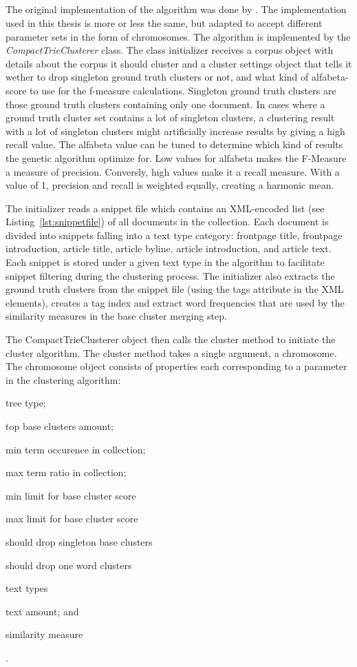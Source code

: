 \subsection{\CTC}
The original implementation of the \CTC algorithm was done by \supervisor. The implementation used in this thesis is more or less the same, but adapted to accept different parameter sets in the form of chromosomes. The algorithm is implemented by the \textit{CompactTrieClusterer} class. The class initializer receives a corpus object with details about the corpus it should cluster and a cluster settings object that tells it wether to drop singleton ground truth clusters or not, and what kind of alfabeta-score to use for the f-measure calculations. Singleton ground truth clusters are those ground truth clusters containing only one document. In cases where a ground truth cluster set contains a lot of singleton clusters, a clustering result with a lot of singleton clusters might artificially increase results by giving a high recall value. The alfabeta value can be tuned to determine which kind of results the genetic algorithm optimize for. Low values for alfabeta makes the F-Measure a measure of precision. Conversly, high values make it a recall measure. With a value of 1, precision and recall is weighted equally, creating a harmonic mean.

The initializer reads a snippet file which contains an XML-encoded list (see Listing~\ref{lst:snippetfile}) of all documents in the collection. Each document is divided into snippets falling into a text type category: frontpage title, frontpage introduction, article title, article byline, article introduction, and article text. Each snippet is stored under a given text type in the algorithm to facilitate snippet filtering during the clustering process. The initializer also extracts the ground truth clusters from the snippet file (using the tags attribute in the XML elements), creates a tag index and extract word frequencies that are used by the similarity measures in the base cluster merging step.

The CompactTrieClusterer object then calls the cluster method to initiate the cluster algorithm. The cluster method takes a single argument, a chromosome. The chromosome object consists of properties each corresponding to a parameter in the clustering algorithm:
\begin{inparaenum}[\itshape 1\upshape)]
\item tree type;
\item top base clusters amount;
\item min term occurence in collection;
\item max term ratio in collection;
\item min limit for base cluster score
\item max limit for base cluster score
\item should drop singleton base clusters
\item should drop one word clusters
\item text types
\item text amount; and
\item similarity measure
\end{inparaenum}.


